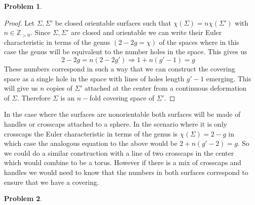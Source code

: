 \documentclass[10pt]{article}
\newcommand{\sk}{\vskip 10mm}
\newcommand{\bb}[1]{\mathbb{#1}}
\theoremstyle{plain}
\newtheorem{problem}{Problem}
\theoremstyle{remark}
\begin{document}
\begin{problem} %
  
\end{problem}

\begin{proof}
  Let $\Sigma,\Sigma'$ be closed orientable surfaces such that $\chi(\Sigma)=n\chi(\Sigma')$ with $n\in\bb{Z}_{>0}$.
  Since $\Sigma,\Sigma'$ are closed and orientable we can write their Euler characteristic
  in terms of the genus $(2-2g=\chi)$ of the spaces where in this case the genus will be
  equivalent to the number holes in the space. This gives us
  \[ 2-2g = n(2-2g') \Rightarrow 1+n(g'-1)=g\]
  These numbers correspond in such a way that we can construct the covering
  space as a single hole in the space with lines of holes length $g'-1$ emerging.
  This will give us $n$ copies of $\Sigma'$ attached at the center from a continuous
  deformation of $\Sigma$. Therefore $\Sigma$ is an $n-$fold covering space of $\Sigma'$.
\end{proof}

In the case where the surfaces are nonorientable both surfaces will be made of
handles or crosscaps attached to a sphere. In the scenario where it is only crosscaps
the Euler characteristic in terms of the genus is $\chi(\Sigma)=2-g$ in which case
the analogous equation to the above would be $2+n(g'-2)=g$. So we could do a
similar construction with a line of two crosscaps in the center which would
combine to be a torus. However
if there is a mix of crosscaps and handles we would need to know that the
numbers in both surfaces correspond to ensure that we have a covering.

\sk

\begin{problem} %
  
\end{problem}
\end{document}
